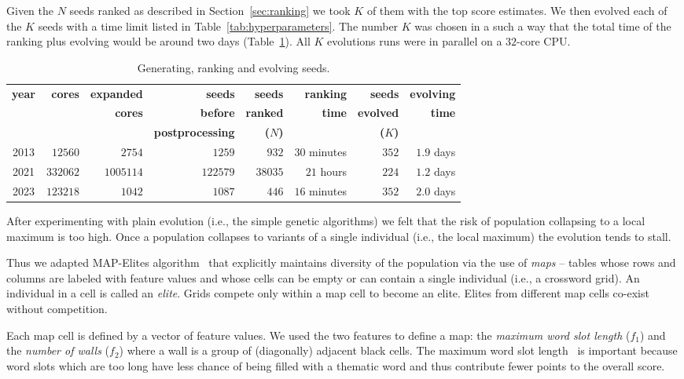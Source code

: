 Given the $N$ seeds ranked as described in Section~\ref{sec:ranking} we took $K$ of them with the top score estimates. We then evolved each of the $K$ seeds with a time limit listed in Table~\ref{tab:hyperparameters}. The number $K$ was chosen in a such a way that the total time of the ranking plus evolving would be around two days (Table~\ref{tab:rankingEvolving}). All $K$ evolutions runs were in parallel on a $32$-core CPU.

\begin{table}[htbp]
\centering
\begin{tabular}{c|r|r|r|r|r|r|r}
\toprule
{\bf year} & {\bf cores} & {\bf expanded} & {\bf seeds} & {\bf seeds} & {\bf ranking} & {\bf seeds} & {\bf evolving}\\
           & & {\bf cores} & {\bf before} & {\bf ranked} & {\bf time} & {\bf evolved} & {\bf time} \\
           & & & {\bf postprocessing} & {\bf ($N$)} & & {\bf ($K$)} & \\
\midrule
2013 & $12560$ & $2754$ & $1259$ & $932$ & $30$ minutes & $352$ & $1.9$ days \\ 
2021 & $332062$ & $1005114$ & $122579$ & $38035$ & $21$ hours & $224$ & $1.2$ days \\ 
2023 & $123218$ & $1042$ & $1087$ & $446$ & $16$ minutes & $352$ & $2.0$ days \\ 
\bottomrule
\end{tabular}
\caption{Generating, ranking and evolving seeds.}
\label{tab:rankingEvolving}
\end{table}

After experimenting with plain evolution (i.e., the simple genetic algorithms) we felt that the risk of population collapsing to a local maximum is too high. Once a population collapses to variants of a single individual (i.e., the local maximum) the evolution tends to stall. 

Thus we adapted MAP-Elites algorithm~\cite{mapElites} that explicitly maintains diversity of the population via the use of {\em maps} -- tables whose rows and columns are labeled with feature values and whose cells can be empty or can contain a single individual (i.e., a crossword grid). An individual in a cell is called an {\em elite}. Grids compete only within a map cell to become an elite. Elites from different map cells co-exist without competition.

Each map cell is defined by a vector of feature values. We used the two features to define a map: the {\em maximum word slot length} ($f_1$) and the {\em number of walls} ($f_2$) where a wall is a group of (diagonally) adjacent black cells. The maximum word slot length~\cite{DBLP:conf/cig/BulitkoB21} is important because word slots which are too long have less chance of being filled with a thematic word and thus contribute fewer points to the overall score. 

